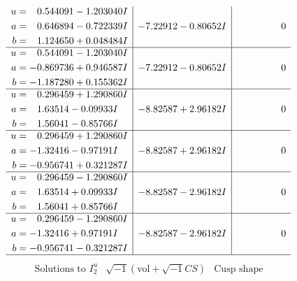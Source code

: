 \documentclass[1p]{elsarticle_modified}
\theoremstyle{definition}
\newcommand{\I}{\sqrt{-1}}
\begin{document}
$$\begin{array}{c|c|c}
\begin{aligned}
u &= \phantom{-}0.544091 - 1.203040 I \\
a &= \phantom{-}0.646894 - 0.722339 I \\
b &= \phantom{-}1.124650 + 0.048484 I\end{aligned}
 & -7.22912 - 0.80652 I & \phantom{-0.000000 } 0 \\ \hline\begin{aligned}
u &= \phantom{-}0.544091 - 1.203040 I \\
a &= -0.869736 + 0.946587 I \\
b &= -1.187280 + 0.155362 I\end{aligned}
 & -7.22912 - 0.80652 I & \phantom{-0.000000 } 0 \\ \hline\begin{aligned}
u &= \phantom{-}0.296459 + 1.290860 I \\
a &= \phantom{-}1.63514 - 0.09933 I \\
b &= \phantom{-}1.56041 - 0.85766 I\end{aligned}
 & -8.82587 + 2.96182 I & \phantom{-0.000000 } 0 \\ \hline\begin{aligned}
u &= \phantom{-}0.296459 + 1.290860 I \\
a &= -1.32416 - 0.97191 I \\
b &= -0.956741 + 0.321287 I\end{aligned}
 & -8.82587 + 2.96182 I & \phantom{-0.000000 } 0 \\ \hline\begin{aligned}
u &= \phantom{-}0.296459 - 1.290860 I \\
a &= \phantom{-}1.63514 + 0.09933 I \\
b &= \phantom{-}1.56041 + 0.85766 I\end{aligned}
 & -8.82587 - 2.96182 I & \phantom{-0.000000 } 0 \\ \hline\begin{aligned}
u &= \phantom{-}0.296459 - 1.290860 I \\
a &= -1.32416 + 0.97191 I \\
b &= -0.956741 - 0.321287 I\end{aligned}
 & -8.82587 - 2.96182 I & \phantom{-0.000000 } 0\\
 \hline 
 \end{array}$$\newpage$$\begin{array}{c|c|c}  
\text{Solutions to }I^u_{2}& \I (\text{vol} + \sqrt{-1}CS) & \text{Cusp shape}\\
 \hline 
\begin{aligned}

\end{aligned}
\end{array}$$
\end{document}
